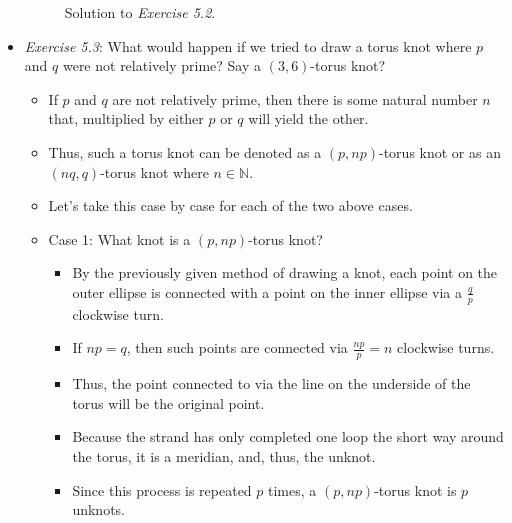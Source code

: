 \documentclass[titlepage]{article}
\numberwithin{figure}{section}
\numberwithin{table}{section}
\numberwithin{equation}{section}
\begin{document}
\begin{itemize}
\begin{figure}[h!]
        \caption{Solution to \emph{Exercise 5.2}.}
        \label{fig:ex5-2}
    \end{figure}
    \item \emph{Exercise 5.3}: What would happen if we tried to draw a torus knot where $p$ and $q$ were not relatively prime? Say a $(3,6)$-torus knot?
    \begin{itemize}
        \item If $p$ and $q$ are not relatively prime, then there is some natural number $n$ that, multiplied by either $p$ or $q$ will yield the other.
        \item Thus, such a torus knot can be denoted as a $(p,np)$-torus knot or as an $(nq,q)$-torus knot where $n\in\mathbb{N}$.
        \item Let's take this case by case for each of the two above cases.
        \item Case 1: What knot is a $(p,np)$-torus knot?
        \begin{itemize}
            \item By the previously given method of drawing a knot, each point on the outer ellipse is connected with a point on the inner ellipse via a $\frac{q}{p}$ clockwise turn.
            \item If $np=q$, then such points are connected via $\frac{np}{p}=n$ clockwise turns.
            \item Thus, the point connected to via the line on the underside of the torus will be the original point.
            \item Because the strand has only completed one loop the short way around the torus, it is a meridian, and, thus, the unknot.
            \item Since this process is repeated $p$ times, a $(p,np)$-torus knot is $p$ unknots.

\end{itemize}
\end{itemize}
\end{itemize}
\end{document}
